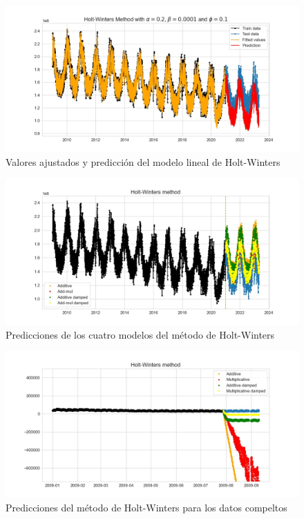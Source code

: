 \documentclass[12pt,twoside]{article}
\begin{document}
\begin{figure}[h]
    \centering
    \includegraphics[width = \textwidth]{imagenes/HoltWinters1.jpg}
    \caption{Valores ajustados y predicción del modelo lineal de Holt-Winters}\label{fig:HoltWinters1}
\end{figure}
\begin{figure}[h]
    \centering
    \includegraphics[width = \textwidth]{imagenes/HoltWinters2.jpg}
    \caption{Predicciones de los cuatro modelos del método de Holt-Winters}\label{fig:HoltWinters2}
\end{figure}



\begin{figure}[h]
    \centering
    \includegraphics[width = \textwidth]{imagenes/HoltWinters5.jpg}
    \caption{Predicciones del método de Holt-Winters para los datos compeltos}\label{fig:HoltWinters5}
\end{figure}
\end{document}
